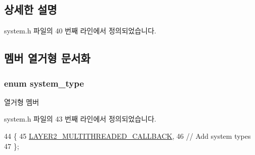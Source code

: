\subsection{상세한 설명}


system.\+h 파일의 40 번째 라인에서 정의되었습니다.



\subsection{멤버 열거형 문서화}
\subsubsection[{\texorpdfstring{system\+\_\+type}{system_type}}]{\setlength{\rightskip}{0pt plus 5cm}enum {\bf system\+\_\+type}}\hypertarget{classavdecc__lib_1_1system_aacdda6e9ef910c6762dd50aefd8ee5bb}{}\label{classavdecc__lib_1_1system_aacdda6e9ef910c6762dd50aefd8ee5bb}
\begin{Desc}
\item[열거형 멤버]\par
\begin{description}
\item[{\em 
L\+A\+Y\+E\+R2\+\_\+\+M\+U\+L\+T\+I\+T\+H\+R\+E\+A\+D\+E\+D\+\_\+\+C\+A\+L\+L\+B\+A\+CK\hypertarget{classavdecc__lib_1_1system_aacdda6e9ef910c6762dd50aefd8ee5bba88df7608630d8183aa6d68acffce3680}{}\label{classavdecc__lib_1_1system_aacdda6e9ef910c6762dd50aefd8ee5bba88df7608630d8183aa6d68acffce3680}
}]\end{description}
\end{Desc}


system.\+h 파일의 43 번째 라인에서 정의되었습니다.


\begin{DoxyCode}
44     \{
45         \hyperlink{classavdecc__lib_1_1system_aacdda6e9ef910c6762dd50aefd8ee5bba88df7608630d8183aa6d68acffce3680}{LAYER2\_MULTITHREADED\_CALLBACK},
46         \textcolor{comment}{// Add system types}
47     \};
\end{DoxyCode}


